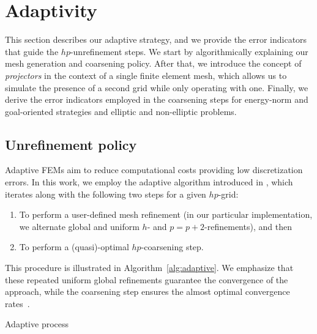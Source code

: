\section{Adaptivity}
\label{sec:GO-adapt}
This section describes our adaptive strategy, and we provide the error indicators that guide the $hp$-unrefinement steps. We start by algorithmically explaining our mesh generation and coarsening policy. After that, we introduce the concept of \emph{projectors} in the context of a single finite element mesh, which allows us to simulate the presence of a second grid while only operating with one. Finally, we derive the error indicators employed in the coarsening steps for energy-norm and goal-oriented strategies and elliptic and non-elliptic problems.

\subsection{Unrefinement policy}


Adaptive FEMs aim to reduce computational costs  providing low discretization errors. In this work, we employ the adaptive algorithm introduced in \cite{darrigrand2020painless}, which iterates along with the following two steps for a given $hp$-grid:
\begin{enumerate}
  \item To perform a user-defined mesh refinement (in our particular implementation, we alternate global and uniform $h$- and $p=p+2$-refinements), and then
  \item To perform a (quasi)-optimal $hp$-coarsening step.
\end{enumerate}
This procedure is illustrated in Algorithm~\ref{alg:adaptive}. We emphasize that these repeated uniform global refinements guarantee the convergence of the approach, while the coarsening step ensures the almost optimal convergence rates~\cite{binev2013instance,canuto2017convergence}.

%

\begin{algorithm}
  \SetAlgoLined

  \caption{Adaptive process}
  \label{alg:adaptive}
\end{algorithm}


